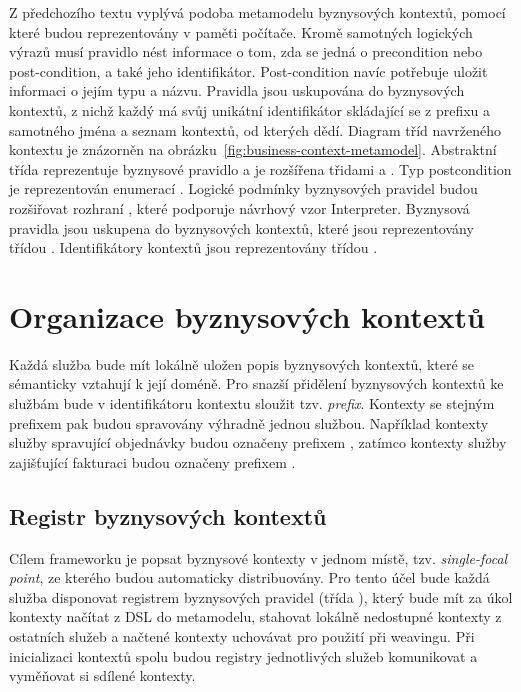 Z předchozího textu vyplývá podoba metamodelu byznysových kontextů, pomocí které
budou reprezentovány v paměti počítače. Kromě samotných logických výrazů musí pravidlo nést
informace o tom, zda se jedná o precondition nebo post-condition, a také jeho identifikátor.
Post-condition navíc potřebuje uložit informaci o jejím typu a názvu. Pravidla jsou uskupována
do byznysových kontextů, z nichž každý má svůj unikátní identifikátor skládající se z prefixu
a samotného jména a seznam kontextů, od kterých dědí. Diagram tříd navrženého kontextu je znázorněn
na obrázku~\ref{fig:business-context-metamodel}. Abstraktní třída  reprezentuje
byznysové pravidlo a je rozšířena třidami  a . Typ
postcondition je reprezentován enumerací . Logické podmínky
byznysových pravidel budou rozšiřovat rozhraní , které podporuje návrhový vzor
Interpreter. Byznysová pravidla jsou uskupena do byznysových kontextů, které jsou reprezentovány
třídou . Identifikátory kontextů jsou reprezentovány třídou .

\section{Organizace byznysových kontextů}

Každá služba bude mít lokálně uložen popis byznysových kontextů, které se sémanticky vztahují
k její doméně. Pro snazší přidělení byznysových kontextů ke službám bude v identifikátoru kontextu sloužit
tzv. \textit{prefix}. Kontexty se stejným prefixem pak budou spravovány výhradně jednou službou. Například kontexty
služby spravující objednávky budou označeny prefixem , zatímco kontexty služby zajišťující fakturaci budou
označeny prefixem .

\subsection{Registr byznysových kontextů}\label{sec:registry-design}

Cílem frameworku je popsat byznysové kontexty v jednom místě, tzv. \textit{single-focal point}, ze kterého budou
automaticky distribuovány. Pro tento účel bude každá služba disponovat registrem byznysových pravidel
(třída ), který bude mít za úkol kontexty načítat z \gls{DSL} do metamodelu,
stahovat lokálně nedostupné kontexty z ostatních služeb a načtené kontexty uchovávat pro použití při weavingu.
Při inicializaci kontextů spolu budou registry jednotlivých služeb komunikovat a vyměňovat si sdílené kontexty.

